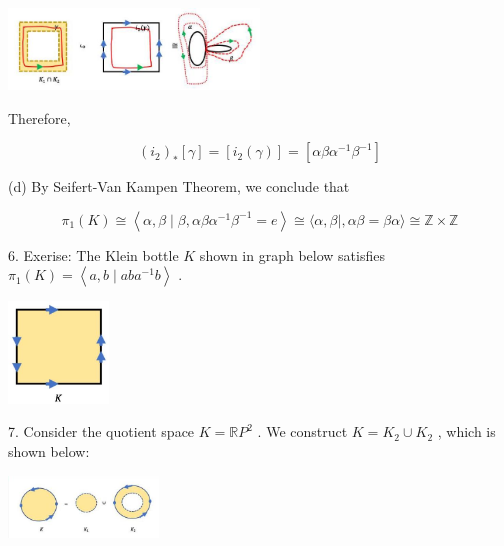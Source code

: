 \begin{center}
\includegraphics[max width=0.5\textwidth]{images/bo_d2bcsrref24c73avs720_153_650_353_651_212_0.jpg}
\end{center}
\hspace*{3em} 

Therefore,

\[
{\left( {i}_{2}\right) }_{ * }\left\lbrack  \gamma \right\rbrack   = \left\lbrack  {{i}_{2}\left( \gamma \right) }\right\rbrack   = \left\lbrack  {{\alpha \beta }{\alpha }^{-1}{\beta }^{-1}}\right\rbrack
\]

(d) By Seifert-Van Kampen Theorem, we conclude that

\[
{\pi }_{1}\left( K\right)  \cong  \left\langle  {\alpha ,\beta  \mid  \beta ,{\alpha \beta }{\alpha }^{-1}{\beta }^{-1} = e}\right\rangle   \cong  \langle \alpha ,\beta  \mid  ,{\alpha \beta } = {\beta \alpha }\rangle  \cong  \mathbb{Z} \times  \mathbb{Z}
\]

6. Exerise: The Klein bottle \(K\) shown in graph below satisfies \({\pi }_{1}\left( K\right)  = \left\langle  {a,b \mid  {ab}{a}^{-1}b}\right\rangle\) .

\begin{center}
\includegraphics[max width=0.2\textwidth]{images/bo_d2bcsrref24c73avs720_153_825_1135_333_338_0.jpg}
\end{center}
\hspace*{3em} 

7. Consider the quotient space \(K = \mathbb{R}{P}^{2}\) . We construct \(K = {K}_{2} \cup  {K}_{2}\) , which is shown below:

\begin{center}
\includegraphics[max width=0.3\textwidth]{images/bo_d2bcsrref24c73avs720_153_757_1721_442_183_0.jpg}
\end{center}
\hspace*{3em} 

